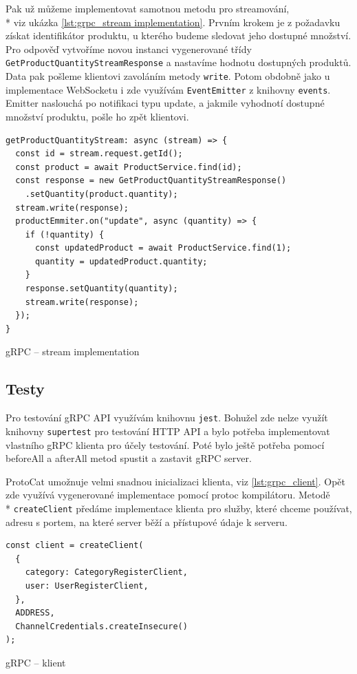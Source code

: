 \documentclass[thesis=M,czech]{FITthesis}[2019/12/23]
\begin{document}
Pak už můžeme implementovat samotnou metodu pro streamování,\\* viz ukázka \ref{lst:grpc_stream implementation}. Prvním krokem je z požadavku získat identifikátor produktu, u kterého budeme sledovat jeho dostupné množství. Pro odpověď vytvoříme novou instanci vygenerované třídy \texttt{GetProductQuantityStreamResponse} a nastavíme hodnotu dostupných produktů. Data pak pošleme klientovi zavoláním metody \texttt{write}. Potom obdobně jako u implementace WebSocketu i zde využívám \texttt{EventEmitter} z knihovny \texttt{events}. Emitter naslouchá po notifikaci typu update, a jakmile vyhodnotí dostupné množství produktu, pošle ho zpět klientovi.

\begin{listing}[H]
\begin{verbatim}
getProductQuantityStream: async (stream) => {
  const id = stream.request.getId();
  const product = await ProductService.find(id);
  const response = new GetProductQuantityStreamResponse()
    .setQuantity(product.quantity);
  stream.write(response);
  productEmmiter.on("update", async (quantity) => {
    if (!quantity) {
      const updatedProduct = await ProductService.find(1);
      quantity = updatedProduct.quantity;
    }
    response.setQuantity(quantity);
    stream.write(response);
  });
}
\end{verbatim}
\caption{gRPC -- stream implementation}
\label{lst:grpc_stream implementation}
\end{listing}

\subsection{Testy}
Pro testování gRPC API využívám knihovnu \texttt{jest}. Bohužel zde nelze využít knihovny \texttt{supertest} pro testování HTTP API a bylo potřeba implementovat vlastního gRPC klienta pro účely testování. Poté bylo ještě potřeba pomocí beforeAll a afterAll metod spustit a zastavit gRPC server.

ProtoCat umožnuje velmi snadnou inicializaci klienta, viz \ref{lst:grpc_client}. Opět zde využívá vygenerované implementace pomocí protoc kompilátoru. Metodě \\* \texttt{createClient} předáme implementace klienta pro služby, které chceme používat, adresu s portem, na které server běží a přístupové údaje k serveru.

\begin{listing}[H]
\begin{verbatim}
const client = createClient(
  {
    category: CategoryRegisterClient,
    user: UserRegisterClient,
  },
  ADDRESS,
  ChannelCredentials.createInsecure()
);
\end{verbatim}
\caption{gRPC -- klient}
\label{lst:grpc_client}
\end{listing}
\end{document}
